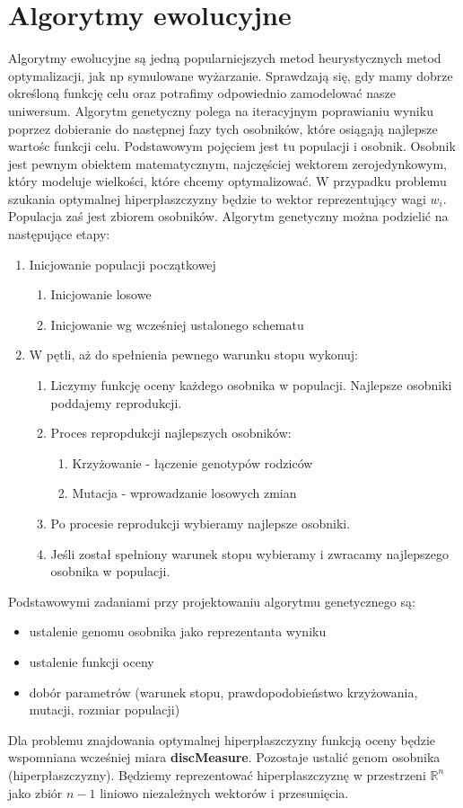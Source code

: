 \documentclass[magisterska]{pracamgr}
\theoremstyle{plain}
\theoremstyle{definition}
\theoremstyle{remark}
\begin{document}
\section{Algorytmy ewolucyjne}
Algorytmy ewolucyjne są jedną popularniejszych metod heurystycznych metod optymalizacji, jak np symulowane wyżarzanie. Sprawdzają się,
gdy mamy dobrze określoną funkcję celu oraz potrafimy odpowiednio zamodelować nasze uniwersum. Algorytm genetyczny polega na iteracyjnym 
poprawianiu wyniku poprzez dobieranie do następnej fazy tych osobników, które osiągają najlepsze wartośc funkcji celu. Podstawowym
pojęciem jest tu populacji i osobnik. Osobnik jest pewnym obiektem matematycznym, najczęściej wektorem zerojedynkowym, który modeluje
wielkości, które chcemy optymalizować. W przypadku problemu szukania optymalnej hiperpłaszczyzny będzie to wektor reprezentujący wagi $w_i$.
Populacja zaś jest zbiorem osobników. Algorytm genetyczny można podzielić na następujące etapy:
\begin{enumerate}
 \item Inicjowanie populacji początkowej
 \begin{enumerate}
  \item Inicjowanie losowe
  \item Inicjowanie wg wcześniej ustalonego schematu
 \end{enumerate}
 \item W pętli, aż do spełnienia pewnego warunku stopu wykonuj:
 \begin{enumerate}
  \item Liczymy funkcję oceny każdego osobnika w populacji. Najlepsze osobniki poddajemy reprodukcji.
  \item Proces repropdukcji najlepszych osobników:
  \begin{enumerate}
   \item Krzyżowanie - łączenie genotypów rodziców
   \item Mutacja - wprowadzanie losowych zmian
  \end{enumerate}
  \item Po procesie reprodukcji wybieramy najlepsze osobniki.
  \item Jeśli został spełniony warunek stopu wybieramy i zwracamy najlepszego osobnika w populacji.
 \end{enumerate}
\end{enumerate}
Podstawowymi zadaniami przy projektowaniu algorytmu genetycznego są:
\begin{itemize}
 \item ustalenie genomu osobnika jako reprezentanta wyniku
 \item ustalenie funkcji oceny
 \item dobór parametrów (warunek stopu, prawdopodobieństwo krzyżowania, mutacji, rozmiar populacji)
\end{itemize}
Dla problemu znajdowania optymalnej hiperpłaszczyzny funkcją oceny będzie wspomniana wcześniej miara \textbf{discMeasure}.
Pozostaje ustalić genom osobnika (hiperpłaszczyzny). Będziemy reprezentować hiperpłaszczyznę w przestrzeni $\mathbb{R}^n$
jako zbiór $n-1$ liniowo niezależnych wektorów i przesunięcia. 
\end{document}
